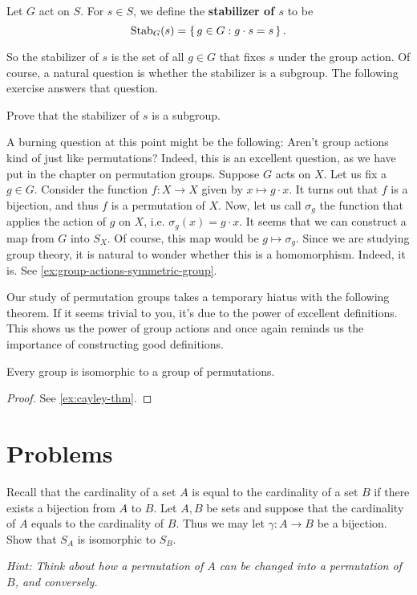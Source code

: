 \documentclass[./main.tex]{subfiles}
\begin{document}
\begin{definition}[Stabilizer]
\label{def:group-action-stabilizer}
    Let $G$ act on $S$. For $s \in S$, we define the \textbf{stabilizer of $s$}
    to be 
    \[
        \operatorname{Stab}_G (s) = \set{g \in G: g \cdot s = s}.
    \]
\end{definition}
So the stabilizer of $s$ is the set of all $g \in G$ that fixes $s$ under the
group action. Of course, a natural question is whether the stabilizer is a
subgroup. The following exercise answers that question.

\begin{exercise}
    Prove that the stabilizer of $s$ is a subgroup.
\end{exercise}

A burning question at this point might be the following: Aren't group actions
kind of just like permutations? Indeed, this is an excellent question, as we
have put in the chapter on permutation groups. Suppose $G$ acts on $X$. Let us
fix a $g \in G$. Consider the function $f: X \to X$ given by $x \mapsto g \cdot
x$. It turns out that $f$ is a bijection, and thus $f$ is a permutation of $X$.
Now, let us call $\sigma_g$ the function that applies the action of $g$ on $X$,
i.e. $\sigma_g(x) = g \cdot x$. It seems that we can construct a map from $G$
into $S_X$. Of course, this map would be $g \mapsto \sigma_g$. Since we are
studying group theory, it is natural to wonder whether this is a homomorphism.
Indeed, it is. See \cref{ex:group-actions-symmetric-group}.

Our study of permutation groups takes a temporary hiatus with the following
theorem. If it seems trivial to you, it's due to the power of excellent
definitions. This shows us the power of group actions and once again reminds us
the importance of constructing good definitions.
\begin{theorem}
    Every group is isomorphic to a group of permutations. 
\end{theorem}
\begin{proof}
    See \cref{ex:cayley-thm}.
\end{proof}


\section{Problems}

\begin{exercise}
\label{exercise:permutation-group-only-depends-on-cardinality}
    Recall that the cardinality of a set $A$ is equal to the cardinality of a
    set $B$ if there exists a bijection from $A$ to $B$. Let $A, B$ be sets and
    suppose that the cardinality of $A$ equals to the cardinality of $B$. Thus
    we may let $\gamma: A \to B$ be a bijection. Show that $S_A$ is isomorphic
    to $S_B$.

    \textit{Hint: Think about how a permutation of $A$ can be changed into a permutation of $B$, and conversely.}
\end{exercise}
\end{document}
